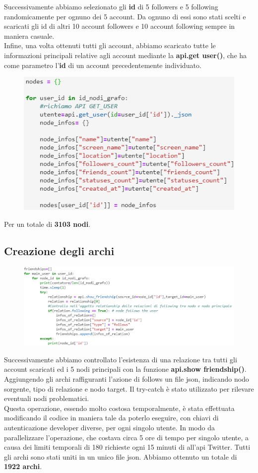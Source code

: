 \documentclass[a4paper,11pt]{report}
\begin{document}
Successivamente abbiamo selezionato gli \textbf{id} di 5 followers e 5 following randomicamente per ognuno dei 5 account. Da ognuno di essi sono stati scelti e scaricati gli id di altri 10 account followers e 10 account following sempre in maniera casuale.\\

Infine, una volta ottenuti tutti gli account, abbiamo scaricato tutte le informazioni principali relative agli account mediante la \textbf{api.get user()}, che ha come parametro l'\textbf{id} di un account precedentemente individuato.\\
\begin{figure}[ht]
	\centering
	\includegraphics[width=0.4\linewidth]{api_get_user}
	\label{fig:apigetuser}
\end{figure}

Per un totale di \textbf{3103 nodi}.
\subsection{Creazione degli archi}
\begin{figure}[h]
	\centering
	\includegraphics[width=0.8\linewidth]{api_show_friendships}
	\label{fig:apishowfriendships}
\end{figure}

Successivamente abbiamo controllato l'esistenza di una relazione tra tutti gli account scaricati ed i 5 nodi principali con la funzione \textbf{api.show friendship()}. Aggiungendo gli archi raffiguranti l'azione di follows un file json, indicando nodo sorgente, tipo di relazione e nodo target. Il try-catch è stato utilizzato per rilevare eventuali nodi problematici.\pagebreak \\
Questa operazione, essendo molto costosa temporalmente, è stata effettuata modificando il codice in maniera tale da poterlo eseguire, con chiavi di autenticazione developer diverse, per ogni singolo utente. In modo da parallelizzare l'operazione, che costava circa 5 ore di tempo per singolo utente, a causa dei limiti temporali di 180 richieste ogni 15 minuti di all'api Twitter. Tutti gli archi sono stati uniti in un unico file json. Abbiamo ottenuto un totale di \textbf{1922 archi}.
\end{document}
